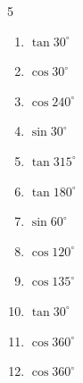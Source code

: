 \begin{multicols}{5}
\begin{enumerate}
        \phantom{$\displaystyle なし$}

  \item $\displaystyle \tan{30^\circ}$


  \item $\displaystyle \cos{30^\circ}$


  \item $\displaystyle \cos{240^\circ}$


  \item $\displaystyle \sin{30^\circ}$


  \item $\displaystyle \tan{315^\circ}$

        \phantom{$\displaystyle =-1$}

  \item $\displaystyle \tan{180^\circ}$

        \phantom{$\displaystyle =0$}

  \item $\displaystyle \sin{60^\circ}$


  \item $\displaystyle \cos{120^\circ}$


  \item $\displaystyle \cos{135^\circ}$


  \item $\displaystyle \tan{30^\circ}$


  \item $\displaystyle \cos{360^\circ}$

        \phantom{$\displaystyle =1$}

  \item $\displaystyle \cos{360^\circ}$

        \phantom{$\displaystyle =1$}

\columnbreak %


\end{enumerate}
\end{multicols}
